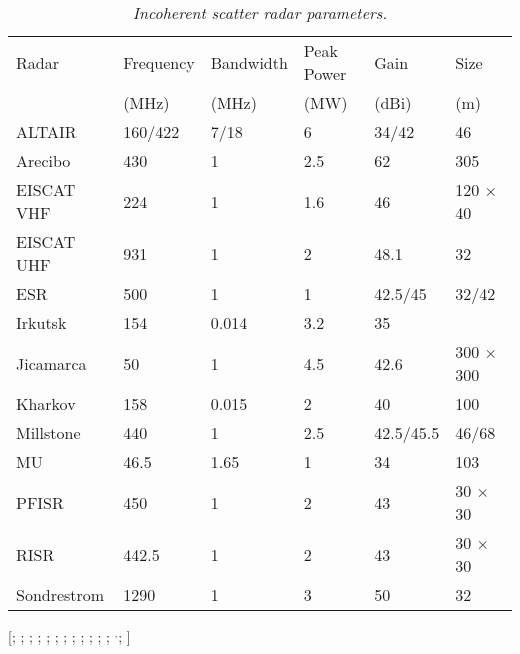 \begin{table}[tb]
 \renewcommand{\arraystretch}{1.2}
 \begin{center}
 \caption[Incoherent scatter radar parameters]{\emph{Incoherent scatter radar parameters.}}
 \label{tab:isr_parameters}
 \begin{tabular}{@{}llllll@{}} %
  \toprule
  Radar & Frequency & Bandwidth & Peak Power & Gain & Size\\
  & (MHz) & (MHz) & (MW) & (dBi) & (m)\\
  \midrule
  ALTAIR\footnotemark[1] & 160/422 & 7/18 & 6 & 34/42 & 46\\
  Arecibo\footnotemark[2] & 430 & 1 & 2.5 & 62 & 305\\
  EISCAT VHF\footnotemark[3] & 224 & 1 & 1.6 & 46 & 120 $\times$ 40\\
  EISCAT UHF\footnotemark[3] & 931 & 1 & 2 & 48.1 & 32\\
  ESR\footnotemark[3] & 500 & 1 & 1 & 42.5/45 & 32/42\\
  Irkutsk\footnotemark[4] & 154 & 0.014 & 3.2 & 35 &\\
  Jicamarca\footnotemark[5] & 50 & 1 & 4.5 & 42.6 & 300 $\times$ 300\\
  Kharkov\footnotemark[6] & 158 & 0.015 & 2 & 40 & 100\\
  Millstone\footnotemark[7] & 440 & 1 & 2.5 & 42.5/45.5 & 46/68\\
  MU\footnotemark[8] & 46.5 & 1.65 & 1 & 34 & 103\\
  PFISR\footnotemark[9] & 450 & 1 & 2 & 43 & 30 $\times$ 30\\
  RISR\footnotemark[10] & 442.5 & 1 & 2 & 43 & 30 $\times$ 30\\
  Sondrestrom\footnotemark[11] & 1290 & 1 & 3 & 50 & 32\\
  \bottomrule
 \end{tabular}
 \end{center}
 
 \footnotesize
 [\footnotemark[1]\cite{TBOT79}; \footnotemark[1]\cite{CHMM02}; \footnotemark[2]\cite{Hag05}; \footnotemark[3]\cite{EISCAT_SPEC}; \footnotemark[4]\cite{PMZ+08}; \footnotemark[5]\cite{Och63}; \footnotemark[5]\cite{JICAMARCA_SPEC}; \footnotemark[6]\cite{BTC06}; \footnotemark[7]\cite{Eva65}; \footnotemark[7]\cite{MILLSTONE_SPEC}; \footnotemark[8]\cite{FST+85}; \footnotemark[9]\cite{CGHN09}; \footnotemark[9]$^{,}$\footnotemark[10]\cite{AMISR_SPEC}; \footnotemark[11]\cite{KHVV95}]
\end{table}%
